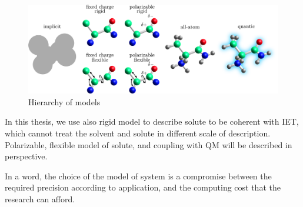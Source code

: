\begin{flushright}
\begin{figure}[h]
\centering{}%
\begin{minipage}[t]{1\columnwidth}%
\begin{center}
\includegraphics[width=1\columnwidth]{_figure/solute}
\par\end{center}%
\end{minipage}\caption{Hierarchy of models\label{fig:Hierarchy-of-models}}
\end{figure}

\par\end{flushright}

In this thesis, we use also rigid model to describe solute to be coherent
with IET, which cannot treat the solvent and solute in different scale
of description. Polarizable, flexible model of solute, and coupling
with QM will be described in perspective.

In a word, the choice of the model of system is a compromise between
the required precision according to application, and the computing
cost that the research can afford.
